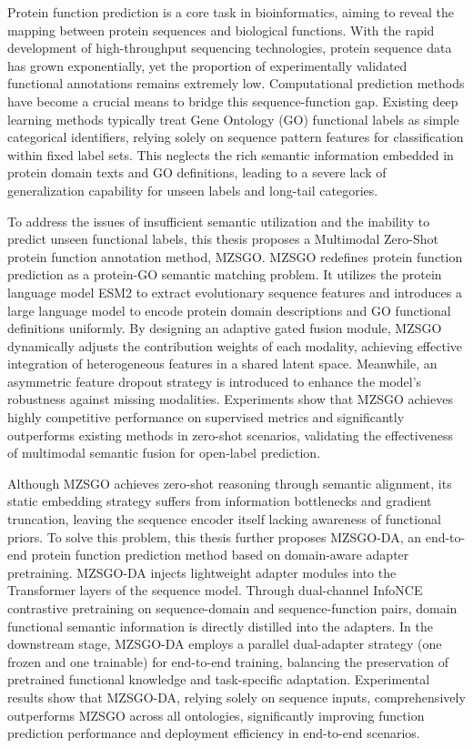 \begin{eabstract}

Protein function prediction is a core task in bioinformatics, aiming to reveal the mapping between protein sequences and biological functions. With the rapid development of high-throughput sequencing technologies, protein sequence data has grown exponentially, yet the proportion of experimentally validated functional annotations remains extremely low. Computational prediction methods have become a crucial means to bridge this sequence-function gap. Existing deep learning methods typically treat Gene Ontology (GO) functional labels as simple categorical identifiers, relying solely on sequence pattern features for classification within fixed label sets. This neglects the rich semantic information embedded in protein domain texts and GO definitions, leading to a severe lack of generalization capability for unseen labels and long-tail categories.

To address the issues of insufficient semantic utilization and the inability to predict unseen functional labels, this thesis proposes a Multimodal Zero-Shot protein function annotation method, MZSGO. MZSGO redefines protein function prediction as a protein-GO semantic matching problem. It utilizes the protein language model ESM2 to extract evolutionary sequence features and introduces a large language model to encode protein domain descriptions and GO functional definitions uniformly. By designing an adaptive gated fusion module, MZSGO dynamically adjusts the contribution weights of each modality, achieving effective integration of heterogeneous features in a shared latent space. Meanwhile, an asymmetric feature dropout strategy is introduced to enhance the model's robustness against missing modalities. Experiments show that MZSGO achieves highly competitive performance on supervised metrics and significantly outperforms existing methods in zero-shot scenarios, validating the effectiveness of multimodal semantic fusion for open-label prediction.

Although MZSGO achieves zero-shot reasoning through semantic alignment, its static embedding strategy suffers from information bottlenecks and gradient truncation, leaving the sequence encoder itself lacking awareness of functional priors. To solve this problem, this thesis further proposes MZSGO-DA, an end-to-end protein function prediction method based on domain-aware adapter pretraining. MZSGO-DA injects lightweight adapter modules into the Transformer layers of the sequence model. Through dual-channel InfoNCE contrastive pretraining on sequence-domain and sequence-function pairs, domain functional semantic information is directly distilled into the adapters. In the downstream stage, MZSGO-DA employs a parallel dual-adapter strategy (one frozen and one trainable) for end-to-end training, balancing the preservation of pretrained functional knowledge and task-specific adaptation. Experimental results show that MZSGO-DA, relying solely on sequence inputs, comprehensively outperforms MZSGO across all ontologies, significantly improving function prediction performance and deployment efficiency in end-to-end scenarios.

\end{eabstract}
